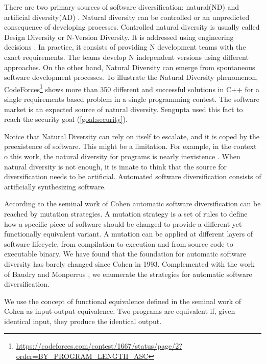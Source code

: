 There are two primary sources of software diversification: natural(ND) and artificial diversity(AD) \cite{natural_diversity}. Natural diversity can be controlled or an unpredicted consequence of developing processes. Controlled natural diversity is usually called Design Diversity or N-Version Diversity. It is addressed using engineering decisions \cite{1659219}. In practice, it consists of providing N development teams with the exact requirements. The teams develop N independent versions using different approaches. On the other hand, Natural Diversity can emerge from spontaneous software development processes. To illustrate the Natural Diversity phenomenon, CodeForces\footnote{\url{https://codeforces.com/contest/1667/status/page/2?order=BY_PROGRAM_LENGTH_ASC}} shows more than 350 different and successful solutions in C++ for a single requirements based problem in a single programming contest. 
The software market is an expected source of natural diversity. Sengupta \etal \cite{10.5555/3091125.3091155} used this fact to reach the security goal (\autoref{goal:security}).



Notice that Natural Diversity can rely on itself to escalate, and it is coped by the preexistence of software. This might be a limitation. For example, in the context o this work, the natural diversity for \wasm programs is nearly inexistence \cite{Hilbig2021AnES}. When natural diversity is not enough, it is innate to think that the source for diversification needs to be artificial. Automated software diversification consists of artificially synthesizing software.

According to the seminal work of Cohen \etal \cite{cohen1993operating} automatic software diversification can be reached by mutation strategies. A mutation strategy is a set of rules to define how a specific piece of software should be changed to provide a different yet functionally equivalent variant. A mutation can be applied at different layers of software lifecycle, from compilation to execution and from source code to executable binary. We have found that the foundation for automatic software diversity has barely changed since Cohen in 1993. Complemented with the work of Baudry and Monperrus \cite{natural_diversity}, we enumerate the strategies for automatic software diversification. 

We use the concept of functional equivalence defined in the seminal work of Cohen \etal \cite{cohen1993operating} as input-output equivalence. Two programs are equivalent if, given identical input, they produce the identical output.

